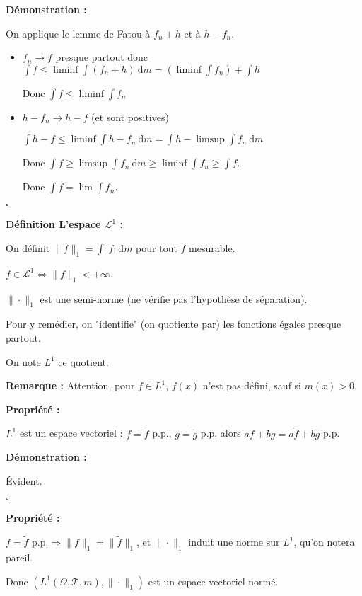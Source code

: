 \documentclass[10pt,a4paper,notitlepage ]{report}
\newcommand{\T}{\mathcal T}
\newcommand{\dd}{\ \mathrm d}
\newcommand{\1}{\mathds 1}
\newcommand{\LL}{\mathcal L}
\newenvironment{definition}[1][]{
	
	\textbf{Définition #1 : }
}
{}
\newcounter{th}
\newenvironment{propriete}[1][]{
	\begin{tcolorbox}
		\textbf{Propriété #1 : }
}
{\end{tcolorbox}}
\newenvironment{demo}[1][]{

	\textbf{Démonstration #1 :}
}{\begin{flushright}
	$\square$
\end{flushright}
}
\newenvironment{rem}{
	
		\textbf{Remarque :}}{}
\begin{document}
\begin{demo}
	On applique le lemme de Fatou à $f_n+h$ et à $h-f_n$.
	\begin{itemize}
		\item $f_n \rightarrow f$ presque partout donc $\int f \le \liminf \int(f_n+h) \dd m = (\liminf \int f_n) + \int h$
		
		Donc $\int f \le \liminf \int f_n$
		\item $h-f_n \rightarrow  h-f$ (et sont positives)
		
		$\int h-f \le \liminf \int h - f_n \dd m = \int h - \limsup \int f_n \dd m$
		
		Donc $\int f \ge \limsup \int f_n \dd m \ge \liminf \int f_n \ge \int f$.
		
		Donc $\int f = \lim \int f_n$.
	\end{itemize}
\end{demo}

\begin{definition}[L'espace $\LL^1$]
	On définit $\|f\|_1 = \int|f|\dd m$ pour tout $f$ mesurable.
	
	$f\in \LL^1 \Leftrightarrow \|f\|_1 < + \infty$.
	
	$\|\cdot \|_1$ est une semi-norme (ne vérifie pas l'hypothèse de séparation).
\end{definition}

Pour y remédier, on "identifie" (on quotiente par) les fonctions égales presque partout.

On note $L^1$ ce quotient.

\begin{rem}
	Attention, pour $f\in L^1$, $f(x)$ n'est pas défini, sauf si $m({x}) > 0$.
\end{rem}

\begin{propriete}
	$L^1$ est un espace vectoriel :
	$f=\tilde f$ p.p., $g=\tilde g$ p.p. alors $af+bg = a\tilde f + b\tilde g$ p.p.
\end{propriete}
\begin{demo}
	Évident.
\end{demo}

\begin{propriete}
	$f = \tilde f  \text{ p.p.}\Rightarrow \|f\|_1 = \|\tilde f\|_1$, et $\|\cdot \|_1$ induit une norme sur $L^1$, qu'on notera pareil.
	
	Donc $(L^1(\Omega,\T,m), \|\cdot\|_1)$ est un espace vectoriel normé.
\end{propriete}
\end{document}
